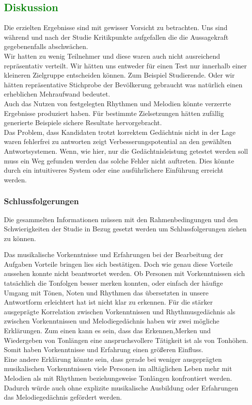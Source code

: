 \documentclass{acm_proc_article-sp}
\begin{document}
\subsection{\textcolor{green}{Diskussion}}
Die erzielten Ergebnisse sind mit gewisser Vorsicht zu betrachten. Uns sind während und nach der Studie Kritikpunkte aufgefallen die die Aussagekraft gegebenenfalls abschwächen.\\
Wir hatten zu wenig Teilnehmer und diese waren auch nicht ausreichend repräsentativ verteilt. Wir hätten uns entweder für einen Test nur innerhalb einer kleineren Zielgruppe entscheiden können. Zum Beispiel Studierende. Oder wir hätten repräsentative Stichprobe der Bevölkerung gebraucht was natürlich einen erheblichen Mehraufwand bedeutet.\\
Auch das Nutzen von festgelegten Rhythmen und Melodien könnte verzerrte Ergebnisse produziert haben. Für bestimmte Zielsetzungen hätten zufällig generierte Beispiele sichere Resultate hervorgebracht. \\
Das Problem, dass Kandidaten trotzt korrektem Gedächtnis nicht in der Lage waren fehlerfrei zu antworten zeigt Verbesserungspotential an den gewählten Antwortsystemen. Wenn, wie hier, nur die Gedächtnisleistung getestet werden soll muss ein Weg gefunden werden das solche Fehler nicht auftreten. Dies könnte durch ein intuitiveres System oder eine ausführlichere Einführung erreicht werden.\\

\subsubsection{Schlussfolgerungen}
Die gesammelten Informationen müssen mit den Rahmenbedingungen und den Schwierigkeiten der Studie in Bezug gesetzt werden um Schlussfolgerungen ziehen zu können.

Das musikalische Vorkenntnisse und Erfahrungen bei der Bearbeitung der Aufgaben Vorteile bringen lies sich bestätigen. Doch wie genau diese Vorteile aussehen konnte nicht beantwortet werden. Ob Personen mit Vorkenntnissen sich tatsächlich die Tonfolgen besser merken konnten, oder einfach der häufige Umgang mit Tönen, Noten und Rhythmen das übersetzten in unsere Antwortform erleichtert hat ist nicht klar zu erkennen. 
Für die stärker ausgeprägte Korrelation zwischen Vorkenntnissen und Rhythmusgedächnis als zwischen Vorkenntnissen und Melodiegedächnis haben wir zwei mögliche Erklärungen. Zum einen kann es sein, dass das Erkennen,Merken und Wiedergeben von Tonlängen eine anspruchsvollere Tätigkeit ist als von Tonhöhen. Somit haben Vorkenntnisse und Erfahrung einen größeren Einfluss. \\
Eine andere Erklärung könnte sein, dass gerade bei weniger ausgeprägten musikalischen Vorkenntnissen viele Personen im alltäglichen Leben mehr mit Melodien als mit Rhythmen beziehungsweise Tonlängen konfrontiert werden. Dadurch würde auch ohne explizite musikalische Ausbildung oder Erfahrungen das Melodiegedächnis gefördert werden.\\
\end{document}
